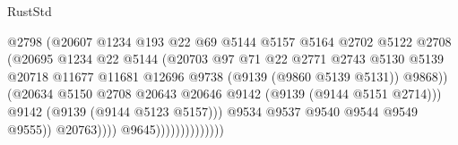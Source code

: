 \begin{lexlean}{RustStd}
\begin{coremodule}
                                            @2798
                                            (@20607
                                              @1234
                                              @193
                                              @22
                                              @69
                                              @5144
                                              @5157
                                              @5164
                                              @2702
                                              @5122
                                              @2708
                                              (@20695
                                                @1234
                                                @22
                                                @5144
                                                (@20703
                                                  @97
                                                  @71
                                                  @22
                                                  @2771
                                                  @2743
                                                  @5130
                                                  @5139
                                                  @20718
                                                  @11677
                                                  @11681
                                                  @12696
                                                  @9738
                                                  (@9139 (@9860 @5139 @5131))
                                                  @9868))
                                              (@20634
                                                @5150
                                                @2708
                                                @20643
                                                @20646
                                                @9142
                                                (@9139 (@9144 @5151 @2714)))
                                              @9142
                                              (@9139 (@9144 @5123 @5157)))
                                            @9534
                                            @9537
                                            @9540
                                            @9544
                                            @9549
                                            @9555))
                                        @20763))))
                                @9645))))))))))))))

\end{coremodule}
\end{lexlean}

